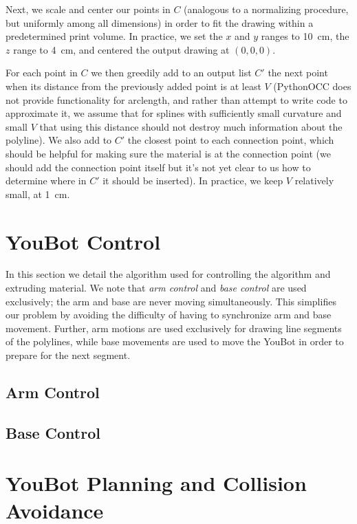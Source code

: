 \documentclass[conference]{acmsiggraph}
\begin{document}
Next, we scale and center our points in $C$ (analogous to a normalizing procedure, but uniformly among all dimensions) in order to fit the drawing within a predetermined print volume.  In practice, we set the $x$ and $y$ ranges to 10~cm, the $z$ range to 4~cm, and centered the output drawing at $(0, 0, 0)$.

For each point in $C$ we then greedily add to an output list $C'$ the next point when its distance from the previously added point is at least $V$ (PythonOCC does not provide functionality for arclength, and rather than attempt to write code to approximate it, we assume that for splines with sufficiently small curvature and small $V$ that using this distance should not destroy much information about the polyline).  We also add to $C'$ the closest point to each connection point, which should be helpful for making sure the material is at the connection point (we should add the connection point itself but it's not yet clear to us how to determine where in $C'$ it should be inserted).  In practice, we keep $V$ relatively small, at 1~cm.

\section{YouBot Control}

In this section we detail the algorithm used for controlling the algorithm and extruding material.  We note that \emph{arm control} and \emph{base control} are used exclusively; the arm and base are never moving simultaneously.  This simplifies our problem by avoiding the difficulty of having to synchronize arm and base movement.  Further, arm motions are used exclusively for drawing line segments of the polylines, while base movements are used to move the YouBot in order to prepare for the next segment.

\subsection{Arm Control}

\subsection{Base Control}

\section{YouBot Planning and Collision Avoidance}
\end{document}
